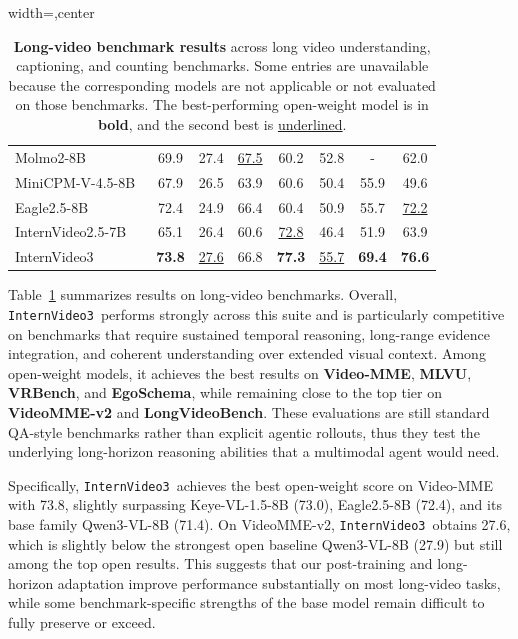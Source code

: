 \documentclass[11pt, letterpaper]{template}
\theoremstyle{plain}
\theoremstyle{definition}
\theoremstyle{remark}
\newcommand{\name}{\texttt{InternVideo3}\xspace}
\begin{document}
\begin{table}[t]
\begin{adjustbox}{width=\linewidth,center}
\begin{tabular}{lccccccc}
Molmo2-8B~\citep{clark2026molmo2} & 69.9 & 27.4 & \underline{67.5} & 60.2 & 52.8 & - & 62.0 \\
MiniCPM-V-4.5-8B~\citep{yu2025minicpm} & 67.9 & 26.5 & 63.9 & 60.6 & 50.4 & 55.9 & 49.6 \\
Eagle2.5-8B~\citep{chen2026eagle} & 72.4 & 24.9 & 66.4 & 60.4 & 50.9 & 55.7 & \underline{72.2} \\
InternVideo2.5-7B~\citep{wang2025internvideo2} & 65.1 & 26.4 & 60.6 & \underline{72.8} & 46.4 & 51.9 & 63.9 \\
InternVideo3 & \textbf{73.8} & \underline{27.6} & 66.8 & \textbf{77.3} & \underline{55.7} & \textbf{69.4} & \textbf{76.6} \\
\bottomrule
\end{tabular}
\end{adjustbox}
\caption{\textbf{Long-video benchmark results} across long video understanding, captioning, and counting benchmarks. Some entries are unavailable because the corresponding models are not applicable or not evaluated on those benchmarks. The best-performing open-weight model is in \textbf{bold}, and the second best is \underline{underlined}.}
\label{tab:long_video_benchmark_results}
\end{table}

Table~\ref{tab:long_video_benchmark_results} summarizes results on long-video benchmarks. Overall, \name\ performs strongly across this suite and is particularly competitive on benchmarks that require sustained temporal reasoning, long-range evidence integration, and coherent understanding over extended visual context. Among open-weight models, it achieves the best results on \textbf{Video-MME}, \textbf{MLVU}, \textbf{VRBench}, and \textbf{EgoSchema}, while remaining close to the top tier on \textbf{VideoMME-v2} and \textbf{LongVideoBench}. These evaluations are still standard QA-style benchmarks rather than explicit agentic rollouts, thus they test the underlying long-horizon reasoning abilities that a multimodal agent would need.

Specifically, \name\ achieves the best open-weight score on Video-MME with 73.8, slightly surpassing Keye-VL-1.5-8B (73.0), Eagle2.5-8B (72.4), and its base family Qwen3-VL-8B (71.4). On VideoMME-v2, \name\ obtains 27.6, which is slightly below the strongest open baseline Qwen3-VL-8B (27.9) but still among the top open results. This suggests that our post-training and long-horizon adaptation improve performance substantially on most long-video tasks, while some benchmark-specific strengths of the base model remain difficult to fully preserve or exceed.
\end{document}
